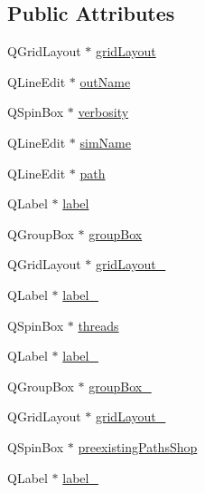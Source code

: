 \subsection*{Public Attributes}
\begin{DoxyCompactItemize}
\item 
Q\+Grid\+Layout $\ast$ \mbox{\hyperlink{class_ui___run_dialog_a248d4a60fd087e62354e4bcf774d0bd7}{grid\+Layout}}
\item 
Q\+Line\+Edit $\ast$ \mbox{\hyperlink{class_ui___run_dialog_af9fc0d6291d38ae8ce30c043ec79bfa2}{out\+Name}}
\item 
Q\+Spin\+Box $\ast$ \mbox{\hyperlink{class_ui___run_dialog_a42187baf1b2ed195c91c205f5767fe9d}{verbosity}}
\item 
Q\+Line\+Edit $\ast$ \mbox{\hyperlink{class_ui___run_dialog_adb3f68ef67438ce1ad18a1284bece7b6}{sim\+Name}}
\item 
Q\+Line\+Edit $\ast$ \mbox{\hyperlink{class_ui___run_dialog_a9ddbcf751d30a9e202341558c2146561}{path}}
\item 
Q\+Label $\ast$ \mbox{\hyperlink{class_ui___run_dialog_ad3b402cb66950f9001b7587c9a326f3a}{label}}
\item 
Q\+Group\+Box $\ast$ \mbox{\hyperlink{class_ui___run_dialog_aca33c5fb6feaa1a317be46ec860c48cd}{group\+Box}}
\item 
Q\+Grid\+Layout $\ast$ \mbox{\hyperlink{class_ui___run_dialog_abf0345d89e9ccae00b4b9bc6e584bdcd}{grid\+Layout\+\_}}
\item 
Q\+Label $\ast$ \mbox{\hyperlink{class_ui___run_dialog_aaf5cbe80077dc12202712ff576888406}{label\+\_}}
\item 
Q\+Spin\+Box $\ast$ \mbox{\hyperlink{class_ui___run_dialog_aa9e987e8ca8be173620853fe11629368}{threads}}
\item 
Q\+Label $\ast$ \mbox{\hyperlink{class_ui___run_dialog_a120707b4e38588ac7f855c28f64bf7d1}{label\+\_}}
\item 
Q\+Group\+Box $\ast$ \mbox{\hyperlink{class_ui___run_dialog_a5e02204a69100d047178a785d326baf9}{group\+Box\+\_}}
\item 
Q\+Grid\+Layout $\ast$ \mbox{\hyperlink{class_ui___run_dialog_a9d525ed6388098574c366dd255221b14}{grid\+Layout\+\_}}
\item 
Q\+Spin\+Box $\ast$ \mbox{\hyperlink{class_ui___run_dialog_a532ddcd7da909a4a7358e3a36f82effd}{preexisting\+Paths\+Shop}}
\item 
Q\+Label $\ast$ \mbox{\hyperlink{class_ui___run_dialog_a987e39309dc67fdf1b9815ab6c3dca48}{label\+\_}}
\item 

\end{DoxyCompactItemize}
